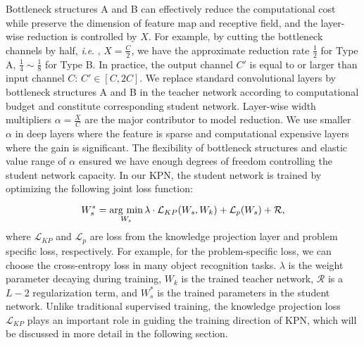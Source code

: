 \documentclass[journal]{IEEEtran}
\newcommand{\ie}{\textit{i}.\textit{e}. }
\newcommand{\argmin}{\operatornamewithlimits{arg\ min}} %
\begin{document}
Bottleneck structures A and B can effectively reduce the computational cost while preserve the dimension of feature map and receptive field, and the layer-wise reduction is controlled by $X$. For example, by cutting the bottleneck channels by half, \ie, $X = \frac{C}{2}$, we have the approximate reduction rate $ \frac{1}{2}$ for Type A, $\frac{1}{4} \sim \frac{1}{8}$ for Type B. In practice, the output channel $C'$ is equal to or larger than input channel $C$: $C'\in [C, 2C]$. We replace standard convolutional layers by bottleneck structures A and B in the teacher network according to computational budget and constitute corresponding student network. Layer-wise width multipliers $\alpha=\frac{X}{C}$ are the major contributor to model reduction. We use smaller $\alpha$ in deep layers where the feature is sparse and computational expensive layers where the gain is significant. The flexibility of bottleneck structures and elastic value range of $\alpha$ ensured we have enough degrees of freedom controlling the student network capacity.
In our KPN, the  student network is  trained by optimizing the following joint loss function:

\begin{equation}
\label{eq:loss_function}
    W^*_s = \argmin_{W_s} \lambda \cdot \mathcal{L}_{KP}(W_s, W_k) + \mathcal{L}_p(W_s) + \mathcal{R},
\end{equation}
where $\mathcal{L}_{KP}$ and $\mathcal{L}_p$ are loss from the knowledge projection layer and problem specific loss, respectively.  For example, for the problem-specific loss, we can choose the cross-entropy loss in many object recognition tasks. $\lambda$ is the weight parameter decaying during training, $W_k$ is the trained teacher network, $\mathcal{R}$ is a $L-2$ regularization term, and $W^*_s$ is the trained parameters in the student network. Unlike traditional supervised training, the knowledge projection loss $\mathcal{L}_{KP}$ plays an important role in guiding the training direction of KPN, which will be discussed in more detail in the following section.
\end{document}
